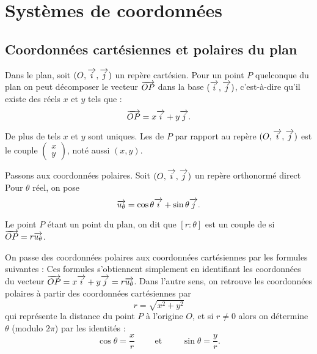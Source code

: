 \documentclass[class=report,crop=false]{standalone}
\begin{document}
 



\section{Systèmes de coordonnées}

\subsection{Coordonnées cartésiennes et polaires du plan}

Dans le plan, soit $(O,\overrightarrow{i},\overrightarrow{j})$ un repère cartésien.
Pour un point $P$ quelconque du plan on peut décomposer le vecteur $\overrightarrow{OP}$
dans la base $(\overrightarrow{i},\overrightarrow{j})$, c'est-à-dire qu'il existe des réels $x$ et $y$ tels que :
$$\overrightarrow{OP} = x \overrightarrow{i}+y\overrightarrow{j}.$$

De plus de tels $x$ et $y$ sont uniques. Les  de $P$ par rapport au
repère $(O,\overrightarrow{i},\overrightarrow{j})$ est le couple 
$\left(\begin{smallmatrix}x\\y\end{smallmatrix}\right)$, noté aussi
$(x,y)$.



\bigskip

Passons aux coordonnées polaires. 
Soit $(O,\overrightarrow{i},\overrightarrow{j})$ un repère orthonormé direct
Pour $\theta$ réel, on pose 
$$\overrightarrow{u_\theta}=\cos\theta\overrightarrow{i}+\sin\theta\overrightarrow{j}.$$

Le point $P$ étant un point du plan, on dit que $[r :\theta]$ est un 
couple de  si $\overrightarrow{OP}=r\overrightarrow{u_\theta}$.



\bigskip

On passe des coordonnées polaires aux coordonnées cartésiennes par les formules suivantes :
Ces formules s'obtiennent simplement en identifiant les coordonnées du vecteur 
$\overrightarrow{OP} = x \overrightarrow{i}+y\overrightarrow{j} = r\overrightarrow{u_\theta}$.
Dans l'autre sens, on retrouve les coordonnées polaires à partir des coordonnées cartésiennes
par 
$$r = \sqrt{x^2+y^2}$$
qui représente la distance du point $P$ à l'origine $O$,
et si $r\neq 0$ alors on détermine $\theta$ (modulo $2\pi$) par
les identités :
$$\cos \theta = \frac{x}{r} \qquad\text{ et }\qquad \sin \theta = \frac{y}{r}.$$
\end{document}
